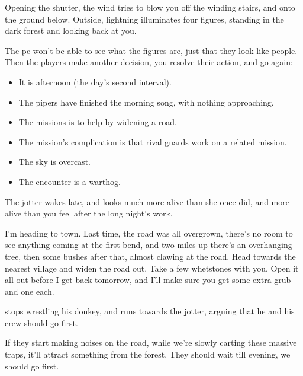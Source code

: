 \begin{multicols}{2}
\begin{boxtext}
  Opening the shutter, the wind tries to blow you off the winding stairs, and onto the ground below.
  Outside, lightning illuminates four figures, standing in the dark forest and looking back at you.
\end{boxtext}

The \gls{pc} won't be able to see what the figures are, just that they look like people.
Then the players make another decision, you resolve their action, and go again:

\begin{itemize}
  \item
  It is afternoon (the day's second \gls{interval}).
  \item
  The pipers have finished the morning song, with nothing approaching.
  \item
  The missions is to help  by widening a road.
  \item
  The mission's complication is that rival \glspl{guard} work on a related mission.
  \item
  The sky is overcast.
  \item
  The encounter is a warthog.
\end{itemize}

\begin{boxtext}
  The \gls{jotter} wakes late, and looks much more alive than she once did, and more alive than you feel after the long night's work.

  \begin{speechtext}
    I'm heading to town.
    Last time, the road was all overgrown, there's no room to see anything coming at the first bend, and two miles up there's an overhanging tree, then some bushes after that, almost clawing at the road.
    Head towards the nearest \gls{village} and widen the road out.
    Take a few whetstones with you.
    Open it all out before I get back tomorrow, and I'll make sure you get some extra grub and one  each.
  \end{speechtext}

\end{boxtext}

\begin{boxtext}
   stops wrestling his donkey, and runs towards the \gls{jotter}, arguing that he and his crew should go first.

  \begin{speechtext}
    If they start making noises on the road, while we're slowly carting these massive traps, it'll attract something from the forest.
    They should wait till evening, we should go first.
  \end{speechtext}


\end{boxtext}
\end{multicols}
